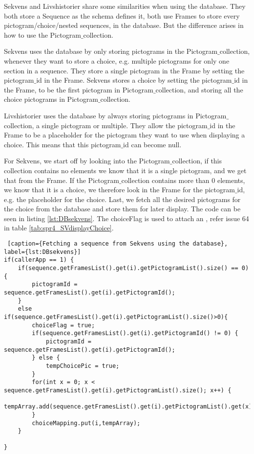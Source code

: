 Sekvens and Livshistorier share some similarities when using the database. They both store a Sequence as the schema defines it, both use Frames to store every pictogram/choice/nested sequences, in the database. But the difference arises in how to use the Pictogram$\_$collection.

Sekvens uses the database by only storing pictograms in the Pictogram$\_$collection, whenever they want to store a choice, e.g. multiple pictograms for only one section in a sequence. They store a single pictogram in the Frame by setting the pictogram$\_$id in the Frame. Sekvens stores a choice by setting the pictogram$\_$id in the Frame, to be the first pictogram in Pictogram$\_$collection, and storing all the choice pictograms in Pictogram$\_$collection.

Livshistorier uses the database by always storing pictograms in Pictogram$\_$collection, a single pictogram or multiple. They allow the pictogram$\_$id in the Frame to be a placeholder for the pictogram they want to use when displaying a choice. This means that this pictogram$\_$id can become null.

For Sekvens, we start off by looking into the Pictogram$\_$collection, if this collection contains no elements we know that it is a single pictogram, and we get that from the Frame. If the Pictogram$\_$collection contains more than 0 elements, we know that it is a choice, we therefore look in the Frame for the pictogram$\_$id, e.g. the placeholder for the choice. Last, we fetch all the desired pictograms for the choice from the database and store them for later display. The code can be seen in listing \ref{lst:DBsekvens}. The choiceFlag is used to attach an , refer issue 64 in table \ref{tab:spr4_SVdisplayChoice}.
\begin{lstlisting} [caption={Fetching a sequence from Sekvens using the database}, label={lst:DBsekvens}]
if(callerApp == 1) {
	if(sequence.getFramesList().get(i).getPictogramList().size() == 0) {
		pictogramId = sequence.getFramesList().get(i).getPictogramId();
	}
	else if(sequence.getFramesList().get(i).getPictogramList().size()>0){
		choiceFlag = true;
		if(sequence.getFramesList().get(i).getPictogramId() != 0) {
			pictogramId = sequence.getFramesList().get(i).getPictogramId();
		} else {
			tempChoicePic = true;
		}
		for(int x = 0; x < sequence.getFramesList().get(i).getPictogramList().size(); x++) {
			tempArray.add(sequence.getFramesList().get(i).getPictogramList().get(x).getId());
		}
		choiceMapping.put(i,tempArray);
	}

}
\end{lstlisting}

